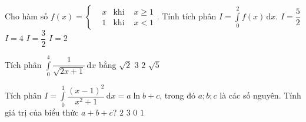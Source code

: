 \begin{ex}%
	Cho hàm số $f(x)=\left\{\begin{aligned}& x & \text {khi } &x\ge 1 \\ &1& \text {khi } &x<1  \end{aligned}\right.$. Tính tích phân $I=\displaystyle\int\limits_0^2 {f(x)\mathrm{\,d}x}$.
	\choice
	{\True $ I=\dfrac{5}{2} $}
	{$ I=4 $}
	{$ I=\dfrac{3}{2} $}
	{$ I=2 $}
\end{ex}

\begin{ex}%
	Tích phân $\displaystyle\int\limits_0 ^4 \dfrac{1}{\sqrt{2x+1}}\mathrm{\,d}x$ bằng	
	\choice
	{$\sqrt{2}$}
	{$3$}
	{ \True $2$}
	{$\sqrt{5}$}
\end{ex}
\begin{ex}%
	Tích phân $I=\displaystyle \int \limits_0^1 \dfrac{(x-1)^2}{x^2+1}\mathrm{\,d}x=a \ln b +c$, trong đó $a;b;c$ là các số nguyên. Tính giá trị của biểu thức $a+b+c$?
	\choice
	{\True $2$}
	{$3$}
	{$0$}
	{$1$}
\end{ex}

